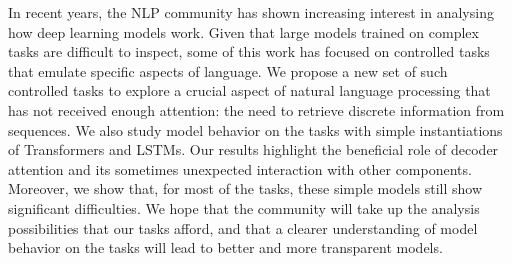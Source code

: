 In recent years, the NLP community has shown increasing interest in analysing how deep learning models work. Given that large models trained on complex tasks are difficult to inspect, some of this work has focused on controlled tasks that emulate specific aspects of language. We propose a new set of such controlled tasks to explore a crucial aspect of natural language processing that has not received enough attention: the need to retrieve discrete information from sequences. We also study model behavior on the tasks with simple instantiations of Transformers and LSTMs. Our results highlight the beneficial role of decoder attention and its sometimes unexpected interaction with other components. Moreover, we show that, for most of the tasks, these simple models still show significant difficulties. We hope that the community will take up the analysis possibilities that our tasks afford, and that a clearer understanding of model behavior on the tasks will lead to better and more transparent models.
